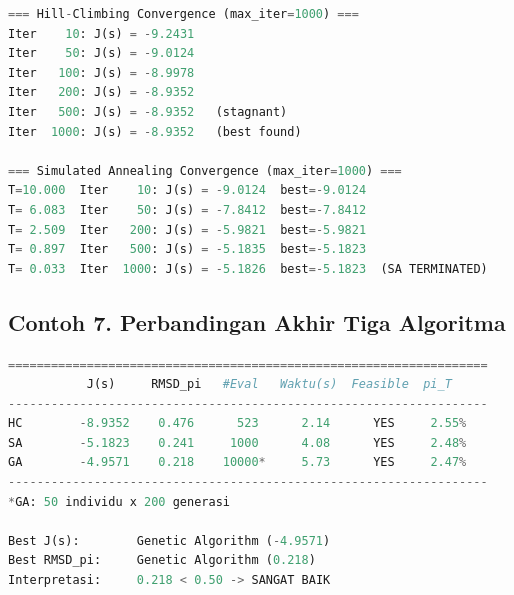 \begin{tcolorbox}[title=Output (nilai $J(s)$ pada beberapa iterasi terpilih)]
    \begin{lstlisting}[language=Python]
=== Hill-Climbing Convergence (max_iter=1000) ===
Iter    10: J(s) = -9.2431
Iter    50: J(s) = -9.0124
Iter   100: J(s) = -8.9978
Iter   200: J(s) = -8.9352
Iter   500: J(s) = -8.9352   (stagnant)
Iter  1000: J(s) = -8.9352   (best found)

=== Simulated Annealing Convergence (max_iter=1000) ===
T=10.000  Iter    10: J(s) = -9.0124  best=-9.0124
T= 6.083  Iter    50: J(s) = -7.8412  best=-7.8412
T= 2.509  Iter   200: J(s) = -5.9821  best=-5.9821
T= 0.897  Iter   500: J(s) = -5.1835  best=-5.1823
T= 0.033  Iter  1000: J(s) = -5.1826  best=-5.1823  (SA TERMINATED)
\end{lstlisting}
\end{tcolorbox}

\subsection*{Contoh 7. Perbandingan Akhir Tiga Algoritma}

\begin{tcolorbox}[title=Output (Ringkasan Perbandingan)]
    \begin{lstlisting}[language=Python]
===================================================================
           J(s)     RMSD_pi   #Eval   Waktu(s)  Feasible  pi_T
-------------------------------------------------------------------
HC        -8.9352    0.476      523      2.14      YES     2.55%
SA        -5.1823    0.241     1000      4.08      YES     2.48%
GA        -4.9571    0.218    10000*     5.73      YES     2.47%
-------------------------------------------------------------------
*GA: 50 individu x 200 generasi

Best J(s):        Genetic Algorithm (-4.9571)
Best RMSD_pi:     Genetic Algorithm (0.218)
Interpretasi:     0.218 < 0.50 -> SANGAT BAIK
\end{lstlisting}
\end{tcolorbox}

